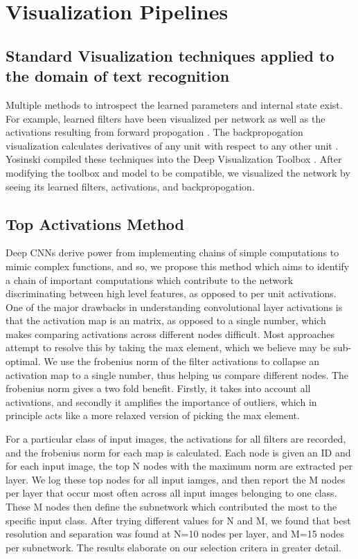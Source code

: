 \documentclass[10pt,twocolumn,letterpaper]{article}
\begin{document}
\section{Visualization Pipelines}


\subsection{Standard Visualization techniques applied to the domain of text recognition}
Multiple methods to introspect the learned parameters and internal state exist. For example, learned filters have been visualized per network as well as the activations resulting from forward propogation \cite{yosinski2015understanding}. The backpropogation visualization calculates derivatives of any unit with respect to any other unit \cite{DBLP:journals/corr/ZeilerF13}. Yosinski compiled these techniques into the Deep Visualization Toolbox \cite{yosinski2015understanding}. After modifying the toolbox and model to be compatible, we visualized the network by seeing its learned filters, activations, and backpropogation.


\subsection{Top Activations Method}
Deep CNNs derive power from implementing chains of simple computations to mimic complex functions, and so, we propose this method which aims to identify a chain of important computations which contribute to the network discriminating between high level features, as opposed to per unit activations. One of the major drawbacks in understanding convolutional layer activations is that the activation map is an matrix, as opposed to a single number, which makes comparing activations across different nodes difficult. Most approaches attempt to resolve this by taking the max element, which we believe may be sub-optimal. We use the frobenius norm of the filter activations to collapse an activation map to a single number, thus helping us compare different nodes. The frobenius norm gives a two fold benefit. Firstly, it takes into account all activations, and secondly it amplifies the importance of outliers, which in principle acts like a more relaxed version of picking the max element. 

For a particular class of input images, the activations for all filters are recorded, and the frobenius norm for each map is calculated. Each node is given an ID and for each input image, the top N nodes with the maximum norm are extracted per layer. We log these top nodes for all input iamges, and then report the M nodes per layer that occur most often across all input images belonging to one class. These M nodes then define the subnetwork which contributed the most to the specific input class. After trying different values for N and M, we found that best resolution and separation was found at N=10 nodes per layer, and M=15 nodes per subnetwork. The results elaborate on our selection critera in greater detail.
\end{document}
